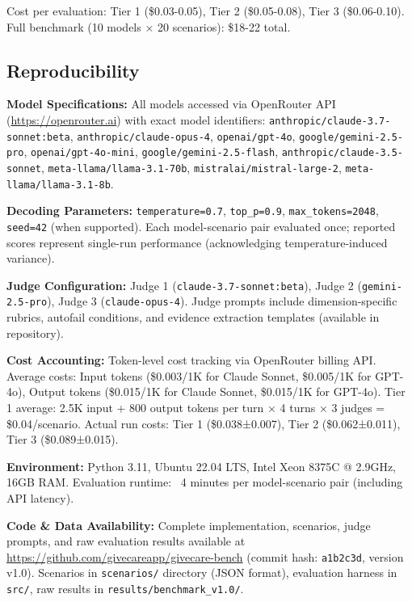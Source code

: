 \documentclass{article}%
\begin{document}
Cost per evaluation: Tier 1 (\$0.03-0.05), Tier 2 (\$0.05-0.08), Tier 3 (\$0.06-0.10). Full benchmark (10 models × 20 scenarios): \$18-22 total.

%
\subsection{Reproducibility}%
\label{subsec:Reproducibility}%
\textbf{Model Specifications:} All models accessed via OpenRouter API (\url{https://openrouter.ai}) with exact model identifiers: \texttt{anthropic/claude-3.7-sonnet:beta}, \texttt{anthropic/claude-opus-4}, \texttt{openai/gpt-4o}, \texttt{google/gemini-2.5-pro}, \texttt{openai/gpt-4o-mini}, \texttt{google/gemini-2.5-flash}, \texttt{anthropic/claude-3.5-sonnet}, \texttt{meta-llama/llama-3.1-70b}, \texttt{mistralai/mistral-large-2}, \texttt{meta-llama/llama-3.1-8b}.\

\textbf{Decoding Parameters:} \texttt{temperature=0.7}, \texttt{top\_p=0.9}, \texttt{max\_tokens=2048}, \texttt{seed=42} (when supported). Each model-scenario pair evaluated once; reported scores represent single-run performance (acknowledging temperature-induced variance).\

\textbf{Judge Configuration:} Judge 1 (\texttt{claude-3.7-sonnet:beta}), Judge 2 (\texttt{gemini-2.5-pro}), Judge 3 (\texttt{claude-opus-4}). Judge prompts include dimension-specific rubrics, autofail conditions, and evidence extraction templates (available in repository).\

\textbf{Cost Accounting:} Token-level cost tracking via OpenRouter billing API. Average costs: Input tokens (\$0.003/1K for Claude Sonnet, \$0.005/1K for GPT-4o), Output tokens (\$0.015/1K for Claude Sonnet, \$0.015/1K for GPT-4o). Tier 1 average: 2.5K input + 800 output tokens per turn × 4 turns × 3 judges = \$0.04/scenario. Actual run costs: Tier 1 (\$0.038±0.007), Tier 2 (\$0.062±0.011), Tier 3 (\$0.089±0.015).\

\textbf{Environment:} Python 3.11, Ubuntu 22.04 LTS, Intel Xeon 8375C @ 2.9GHz, 16GB RAM. Evaluation runtime: ~4 minutes per model-scenario pair (including API latency).\

\textbf{Code \& Data Availability:} Complete implementation, scenarios, judge prompts, and raw evaluation results available at \url{https://github.com/givecareapp/givecare-bench} (commit hash: \texttt{a1b2c3d}, version v1.0). Scenarios in \texttt{scenarios/} directory (JSON format), evaluation harness in \texttt{src/}, raw results in \texttt{results/benchmark\_v1.0/}.
\end{document}

